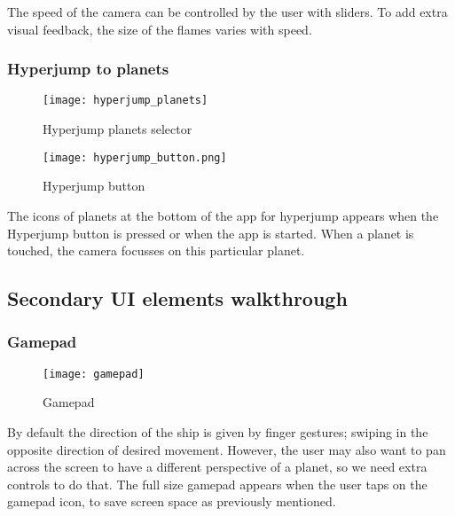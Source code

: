 The speed of the camera can be controlled by the user with sliders. To add extra visual feedback, the size of the flames varies with speed.



\subsubsection{Hyperjump to planets}

\begin{figure}[h!]
  \begin{center}
    \leavevmode
    \ifpdf
      \texttt{[image: hyperjump\_planets]}
    \fi
    \caption{Hyperjump planets selector}
    \label{Hyperjump planets selector}
  \end{center}
\end{figure}

\begin{figure}[!htbp]
  \begin{center}
    \leavevmode
    \ifpdf
      \texttt{[image: hyperjump\_button.png]}
    \fi
    \caption{Hyperjump button}
    \label{Hyperjump button}
  \end{center}
\end{figure}

The icons of planets at the bottom of the app for hyperjump appears when the Hyperjump button is pressed or when the app is started. When a planet is touched, the camera focusses on this particular planet.

\subsection{Secondary UI elements walkthrough}
\subsubsection{Gamepad}

\begin{figure}[!htbp]
  \begin{center}
    \leavevmode
    \ifpdf
      \texttt{[image: gamepad]}
    \fi
    \caption{Gamepad}
    \label{Gamepad}
  \end{center}
\end{figure}

By default the direction of the ship is given by finger gestures; swiping in the opposite direction of desired movement. However, the user may also want to pan across the screen to have a different perspective of a planet, so we need extra controls to do that. The full size gamepad appears when the user taps on the gamepad icon, to save screen space as previously mentioned.

